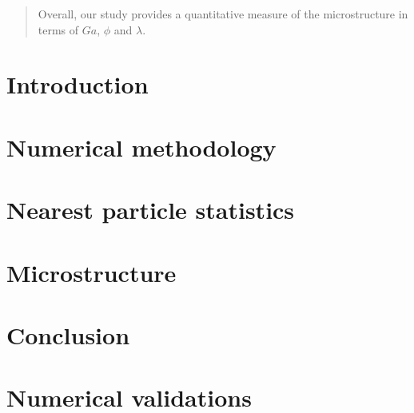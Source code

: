 \documentclass[11pt]{My_preprint}
\begin{document}
\begin{abstract}
    Overall, our study provides a quantitative measure of the microstructure 
     in terms of $Ga$, $\phi$ and $\lambda$. 
\end{abstract}

\section{Introduction}


\section{Numerical methodology}
\label{sec:methodo}





\section{Nearest particle statistics}
\label{sec:nearest}


\section{Microstructure}
\label{sec:microstructure}



\section{Conclusion}
\label{sec:conclusion}


\appendix



\section{Numerical validations}
\label{ap:validation}




\end{document}
